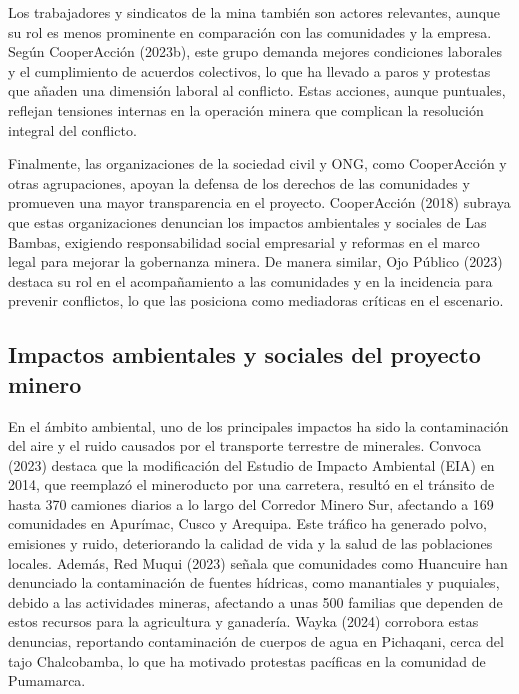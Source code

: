 \documentclass[
  stu,
  floatsintext,
  longtable,
  a4paper,
  nolmodern,
  notxfonts,
  notimes,
  colorlinks=true,linkcolor=blue,citecolor=blue,urlcolor=blue]{apa7}
\begin{document}
Los trabajadores y sindicatos de la mina también son actores relevantes,
aunque su rol es menos prominente en comparación con las comunidades y
la empresa. Según CooperAcción (2023b), este grupo demanda mejores
condiciones laborales y el cumplimiento de acuerdos colectivos, lo que
ha llevado a paros y protestas que añaden una dimensión laboral al
conflicto. Estas acciones, aunque puntuales, reflejan tensiones internas
en la operación minera que complican la resolución integral del
conflicto.

Finalmente, las organizaciones de la sociedad civil y ONG, como
CooperAcción y otras agrupaciones, apoyan la defensa de los derechos de
las comunidades y promueven una mayor transparencia en el proyecto.
CooperAcción (2018) subraya que estas organizaciones denuncian los
impactos ambientales y sociales de Las Bambas, exigiendo responsabilidad
social empresarial y reformas en el marco legal para mejorar la
gobernanza minera. De manera similar, Ojo Público (2023) destaca su rol
en el acompañamiento a las comunidades y en la incidencia para prevenir
conflictos, lo que las posiciona como mediadoras críticas en el
escenario.

\subsection{Impactos ambientales y sociales del proyecto
minero}\label{impactos-ambientales-y-sociales-del-proyecto-minero}

En el ámbito ambiental, uno de los principales impactos ha sido la
contaminación del aire y el ruido causados por el transporte terrestre
de minerales. Convoca (2023) destaca que la modificación del Estudio de
Impacto Ambiental (EIA) en 2014, que reemplazó el mineroducto por una
carretera, resultó en el tránsito de hasta 370 camiones diarios a lo
largo del Corredor Minero Sur, afectando a 169 comunidades en Apurímac,
Cusco y Arequipa. Este tráfico ha generado polvo, emisiones y ruido,
deteriorando la calidad de vida y la salud de las poblaciones locales.
Además, Red Muqui (2023) señala que comunidades como Huancuire han
denunciado la contaminación de fuentes hídricas, como manantiales y
puquiales, debido a las actividades mineras, afectando a unas 500
familias que dependen de estos recursos para la agricultura y ganadería.
Wayka (2024) corrobora estas denuncias, reportando contaminación de
cuerpos de agua en Pichaqani, cerca del tajo Chalcobamba, lo que ha
motivado protestas pacíficas en la comunidad de Pumamarca.
\end{document}
